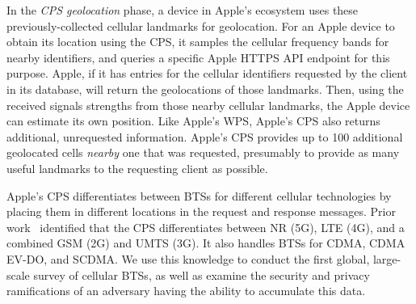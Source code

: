 In the \emph{CPS geolocation} phase, a device in Apple's ecosystem uses these
previously-collected cellular landmarks for geolocation. For an Apple device to
obtain its location using the \ac{CPS}, it samples the cellular frequency bands
for nearby identifiers, and queries a specific Apple HTTPS API endpoint for this
purpose. Apple, if it has entries for the cellular identifiers requested by the
client in its database, will return the geolocations of those landmarks. Then,
using the received signals strengths from those nearby cellular landmarks, the
Apple device can estimate its own position. Like Apple's \ac{WPS}, Apple's
\ac{CPS} also returns additional, unrequested information.  Apple's \ac{CPS}
provides up to 100 additional geolocated cells \emph{nearby} one that was
requested, presumably to provide as many useful landmarks to the requesting
client as possible.

Apple's \ac{CPS} differentiates between \acp{BTS} for different cellular
technologies by placing them in different locations in the request and response
messages. Prior work~\cite{cellguard,isniff} identified that the \ac{CPS}
differentiates between NR (5G), LTE (4G), and a combined GSM (2G) and UMTS (3G).
It also handles \acp{BTS} for \ac{CDMA}, \ac{CDMA} \ac{EV-DO}, and \ac{SCDMA}.
We use this knowledge to conduct the first global, large-scale survey of
cellular \acp{BTS}, as well as examine the security and privacy ramifications of
an adversary having the ability to accumulate this data.

